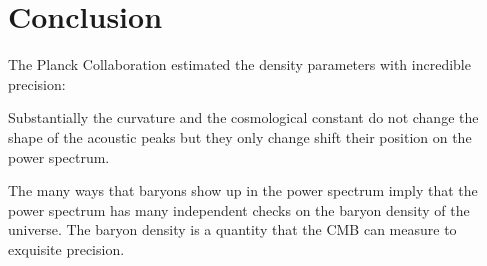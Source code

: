\documentclass{article}
\begin{document}
\section{Conclusion}
The Planck Collaboration estimated the density parameters with incredible precision:

Substantially the curvature and the cosmological constant do not change the shape of the acoustic peaks but they only change shift their position on the power spectrum.
	
The many ways that baryons show up in the power spectrum imply that the power spectrum has many independent checks on the baryon density of the universe.  The baryon density is a quantity that the CMB can measure to exquisite precision.


\nocite{*}



\end{document}
